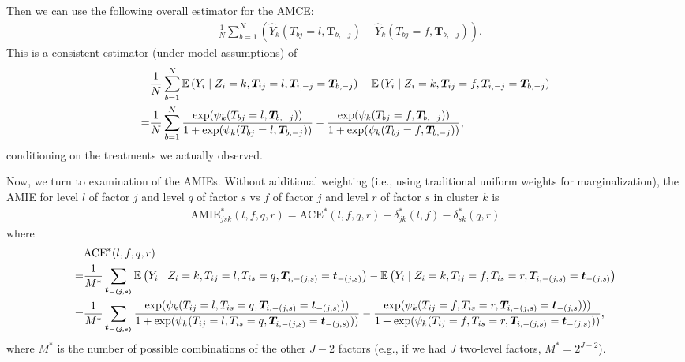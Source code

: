  Then we can use the following overall estimator for the AMCE:
  \begin{align*}
&\frac{1}{N}\sum_{b=1}^{N}\left(\widehat{Y}_k(T_{bj}=l,\bm{T}_{b,-j} ) -\widehat{Y}_k(T_{bj}=f,\bm{T}_{b,-j}) \right).
\end{align*}
 This is a consistent estimator (under model assumptions) of
 \begin{align*}
   &\frac{1}{N}\sum_{b=1}^N\mathbb{E}\left(Y_i \mid Z_i=k, \bm{T}_{ij}=l,
     \bm{T}_{i,-j} =  \bm{T}_{b,-j}\right) - \mathbb{E}\left(Y_i\mid
     Z_i=k,  \bm{T}_{ij}=f, \bm{T}_{i,-j} = \bm{T}_{b,-j}\right)\\
   = & \frac{1}{N}\sum_{b =1}^N\frac{\exp( \psi_k(T_{bj}=l,\bm{T}_{b,-j} ))}{1+\exp(\psi_k(T_{bj}=l,\bm{T}_{b,-j} ))} -\frac{\exp( \psi_k(T_{bj}=f,\bm{T}_{b,-j}))}{1+\exp(\psi_k(T_{bj}=f,\bm{T}_{b,-j} ))},
\end{align*}
 conditioning on the treatments we actually observed. 
 
 Now, we turn to examination of the AMIEs.  Without additional
 weighting (i.e., using traditional uniform weights for
 marginalization), the AMIE for level $l$ of factor $j$ and level $q$
 of factor $s$ vs $f$ of factor $j$ and level $r$ of factor $s$ in
 cluster $k$ is
\begin{align*}
\text{AMIE}^*_{jsk}(l,f, q, r) =\text{ACE}^*(l,f, q, r) -\delta^*_{jk}(l,f)-\delta^*_{sk}(q,r)
\end{align*}
where
\begin{align*}
&\text{ACE}^*(l,f, q, r)\\
= &\frac{1}{M^*}\sum_{\bm{t_{-(j,s)}}} \mathbb{E}\left(Y_i \mid Z_i=k,
    T_{ij}=l,  T_{is}=q, \bm{T}_{i,-(j,s)} = \bm{t}_{-(j,s)}\right)
    -\mathbb{E}\left(Y_i\mid Z_i=k, T_{ij}=f,  T_{is}=r, \bm{T}_{i,-(j,s)} =
    \bm{t}_{-(j,s)}\right) \\  
=&\frac{1}{M^*}\sum_{\bm{t_{-(j,s)}}}\frac{\exp( \psi_k(T_{ij}=l,
   T_{is}=q, \bm{T}_{i,-(j,s)}=\bm{t}_{-(j,s)}
   ))}{1+\exp(\psi_k(T_{ij}=l,
   T_{is}=q,\bm{T}_{i,-(j,s)}=\bm{t}_{-(j,s)} ))} -\frac{\exp(
   \psi_k(T_{ij}=f, T_{is}=r,\bm{T}_{i,-(j,s)}=\bm{t}_{-(j,s})
   ))}{1+\exp(\psi_k(T_{ij}=f,
   T_{is}=r,\bm{T}_{i,-(j,s)}=\bm{t}_{-(j,s)} ))}, 
\end{align*}
where $M^*$ is the number of possible combinations of the other $J-2$ factors (e.g., if we had $J$ two-level factors, $M^* = 2^{J-2}$).

